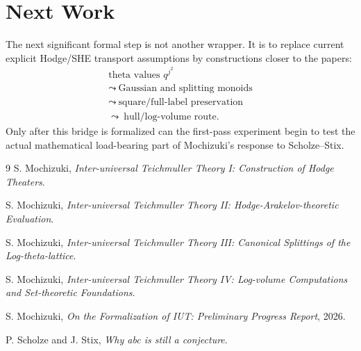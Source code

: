 \documentclass[11pt]{article}
\begin{document}
\section{Next Work}

The next significant formal step is not another wrapper.  It is to replace
current explicit Hodge/SHE transport assumptions by constructions closer to the
papers:
\[
\begin{array}{c}
\text{theta values }q^{j^2}\\
\leadsto\ \text{Gaussian and splitting monoids}\\
\leadsto\ \text{square/full-label preservation}\\
\leadsto\ \text{hull/log-volume route}.
\end{array}
\]
Only after this bridge is formalized can the first-pass experiment begin to test
the actual mathematical load-bearing part of Mochizuki's response to
Scholze--Stix.

\begingroup
\small
\begin{thebibliography}{9}
S. Mochizuki, \emph{Inter-universal Teichmuller Theory I:
Construction of Hodge Theaters}.

S. Mochizuki, \emph{Inter-universal Teichmuller Theory II:
Hodge-Arakelov-theoretic Evaluation}.

S. Mochizuki, \emph{Inter-universal Teichmuller Theory III:
Canonical Splittings of the Log-theta-lattice}.

S. Mochizuki, \emph{Inter-universal Teichmuller Theory IV:
Log-volume Computations and Set-theoretic Foundations}.

S. Mochizuki, \emph{On the Formalization of IUT: Preliminary Progress Report},
2026.

P. Scholze and J. Stix, \emph{Why abc is still a conjecture}.
\end{thebibliography}
\endgroup
\end{document}
